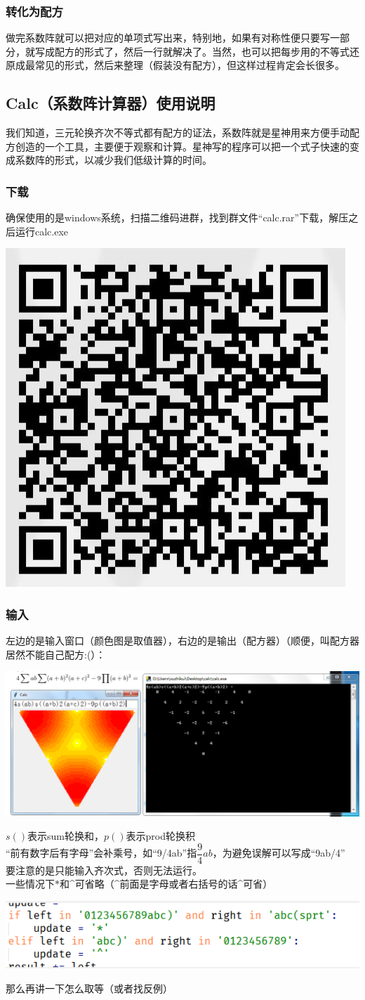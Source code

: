 \documentclass[UTF8]{ctexart}
\begin{document}
\subsubsection{转化为配方}
做完系数阵就可以把对应的单项式写出来，特别地，如果有对称性便只要写一部分，就写成配方的形式了，然后一行就解决了。当然，也可以把每步用的不等式还原成最常见的形式，然后来整理（假装没有配方），但这样过程肯定会长很多。
\subsection{Calc（系数阵计算器）使用说明}
我们知道，三元轮换齐次不等式都有配方的证法，系数阵就是星神用来方便手动配方创造的一个工具，主要便于观察和计算。星神写的程序可以把一个式子快速的变成系数阵的形式，以减少我们低级计算的时间。
\subsubsection{下载}
确保使用的是windows系统，扫描二维码进群，找到群文件“calc.rar”下载，解压之后运行calc.exe
\begin{center}
	\includegraphics[width=0.25\linewidth]{z01}
\end{center}
\subsubsection{输入}
左边的是输入窗口（颜色图是取值器），右边的是输出（配方器）（顺便，叫配方器居然不能自己配方:(）：
\begin{center}
	\includegraphics[width=0.85\linewidth]{z03}
\end{center}
$ s() $表示sum轮换和，$ p() $表示prod轮换积\\
“前有数字后有字母”会补乘号，如“9/4ab”指$ \dfrac{9}{4}ab $，为避免误解可以写成“9ab/4”\\
要注意的是只能输入齐次式，否则无法运行。\\
一些情况下$ * $和\^{}可省略（\^{}前面是字母或者右括号的话\^{}可省）
\begin{center}
	\includegraphics[width=0.5\linewidth]{z02}
\end{center}
那么再讲一下怎么取等（或者找反例）\\
\end{document}
